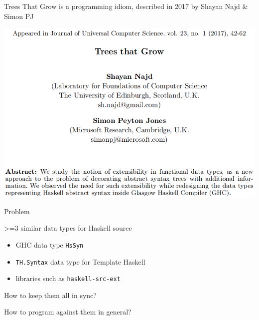 \begin{frame}
\begin{center}
Trees That Grow is a programming idiom, described in 2017 by Shayan Najd \& Simon PJ\cite{najd2016trees}

\noindent\makebox[\linewidth]{\rule{\paperwidth}{0.4pt}}

\includegraphics[height=0.5\textheight]{image/ttg-paper.png}
\end{center}
\end{frame}

\begin{frame}
\begin{center}
Problem

>=3 similar data types for Haskell source

\begin{itemize}
\item GHC data type \lstinline{HsSyn}
\item \lstinline{TH.Syntax} data type for Template Haskell
\item libraries such as \lstinline{haskell-src-ext}
\end{itemize}
\end{center}
\end{frame}

\begin{frame}
\begin{center}
How to keep them all in sync?

How to program against them in general?
\end{center}
\end{frame}

